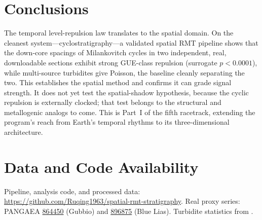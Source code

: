 \documentclass[12pt,a4paper]{article}
\begin{document}
\section{Conclusions}
The temporal level-repulsion law translates to the spatial domain. On the cleanest system---cyclostratigraphy---a validated spatial RMT pipeline shows that the down-core spacings of Milankovitch cycles in two independent, real, downloadable sections exhibit strong GUE-class repulsion (surrogate $p<0.0001$), while multi-source turbidites give Poisson, the baseline cleanly separating the two. This establishes the spatial method and confirms it can grade signal strength. It does not yet test the spatial-shadow hypothesis, because the cyclic repulsion is externally clocked; that test belongs to the structural and metallogenic analogs to come. This is Part~I of the fifth racetrack, extending the program's reach from Earth's temporal rhythms to its three-dimensional architecture.

\section*{Data and Code Availability}
Pipeline, analysis code, and processed data: \url{https://github.com/Ruqing1963/spatial-rmt-stratigraphy}. Real proxy series: PANGAEA \href{https://doi.org/10.1594/PANGAEA.864450}{864450} (Gubbio) and \href{https://doi.org/10.1594/PANGAEA.896875}{896875} (Blue Lias). Turbidite statistics from \citet{awadallah2001}.
\end{document}
